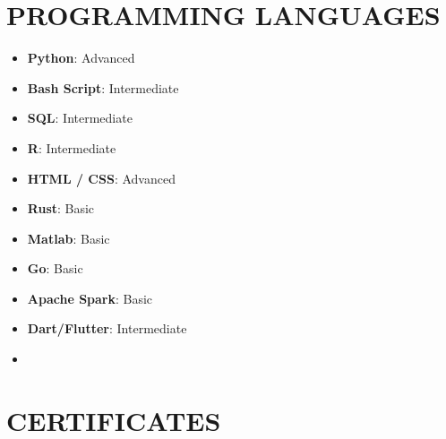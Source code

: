 \documentclass[11 pt,oneside,a4paper,titlepage]{article}
\begin{document}
{\begin{minipage}{11.3cm}

    \vspace*{0.22cm}

    
    \section*{\textcolor{mitred}{{\faCode} PROGRAMMING LANGUAGES}}
    \vspace*{-0.5cm}
    \begin{multicols}{2}    
    \begin{itemize}
    \footnotesize
        \item \textbf{Python}: Advanced
        \item \textbf{Bash Script}: Intermediate
        \item \textbf{SQL}: Intermediate
        \item \textbf{R}: Intermediate 
        \item \textbf{HTML / CSS}: Advanced
        \item \textbf{Rust}: Basic
        \item \textbf{Matlab}: Basic
        \item \textbf{Go}: Basic
        \item \textbf{Apache Spark}: Basic
        \item \textbf{Dart/Flutter}: Intermediate 
        \item[\vspace{\fill}]
    \end{itemize}
    \end{multicols}
    
    \section*{\textcolor{mitred}{{\faCertificate} CERTIFICATES}}
    

\end{minipage}}
\end{document}
